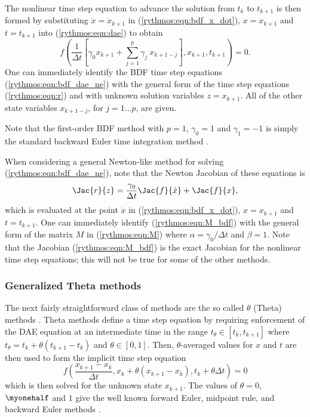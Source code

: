 \documentclass[pdf,ps2pdf,11pt]{SANDreport}
\begin{document}
The nonlinear time step equation to advance the solution from $t_k$ to
$t_{k+1}$ is then formed by substituting $\dot{x} = \dot{x}_{k+1}$ in
(\ref{rythmos:eqn:bdf_x_dot}), $x = x_{k+1}$ and $t = t_{k+1}$ into
(\ref{rythmos:eqn:dae}) to obtain
%
\begin{equation}
f\left( \frac{1}{\Delta t} \left[ \gamma_0 x_{k+1} + \sum_{j=1}^{p} \gamma_j \: x_{k+1-j} \right],x_{k+1},t_{k+1}\right) = 0.
\label{rythmos:eqn:bdf_dae_ne}
\end{equation}
%
One can immediately identify the BDF time step equations
(\ref{rythmos:eqn:bdf_dae_ne}) with the general form of the time step
equations (\ref{rythmos:eqn:r}) and with unknown solution variables $z =
x_{k+1}$.  All of the other state variables $x_{k+1-j}$, for $j = 1 {}\ldots
p$, are given.

Note that the first-order BDF method with $p=1$, $\gamma_0 = 1$ and $\gamma_1 =
-1$ is simply the standard backward Euler time integration method \cite{AscherPetzold}.

When considering a general Newton-like method for solving
(\ref{rythmos:eqn:bdf_dae_ne}), note that the Newton Jacobian of these
equations is
%
\begin{equation}
\Jac{r}{z}
= \frac{\gamma_0}{\Delta t} \Jac{f}{\dot{x}} + \Jac{f}{x},
\label{rythmos:eqn:M_bdf}
\end{equation}
%
which is evaluated at the point $\dot{x}$ in (\ref{rythmos:eqn:bdf_x_dot}), $x
= x_{k+1}$ and $t = t_{k+1}$.  One can immediately identify
(\ref{rythmos:eqn:M_bdf}) with the general form of the matrix $M$ in
(\ref{rythmos:eqn:M}) where $\alpha = {}\gamma_0 / \Delta t$ and $\beta = 1$.
Note that the Jacobian (\ref{rythmos:eqn:M_bdf}) is the exact Jacobian for the
nonlinear time step equations; this will not be true for some of the other
methods.

\subsubsection{Generalized Theta methods}

The next fairly straightforward class of methods are the so called $\theta$
(Theta) methods \cite{HairerWanner}.  Theta methods define a time step
equation by requiring enforcement of the DAE equation at an intermediate time
in the range $t_{\theta} {}\in [t_k,t_{k+1}]$ where $t_{\theta} = t_k + \theta
( t_{k+1} - t_k )$ and $\theta {}\in [0,1]$.  Then, $\theta$-averaged values
for $x$ and $t$ are then used to form the implicit time step equation
%
\begin{equation}
f\left( \frac{x_{k+1} - x_{k}}{\Delta t},x_k + \theta ( x_{k+1} - x_{k} ), t_k + \theta \Delta t \right) = 0
\label{rythmos:eqn:theta_dae_ne}
\end{equation}
%
which is then solved for the unknown state $x_{k+1}$.  The values of $\theta =
0$, $\myonehalf$ and $1$ give the well known forward Euler, midpoint
rule, and backward Euler methods \cite{HairerWanner}.
\end{document}
